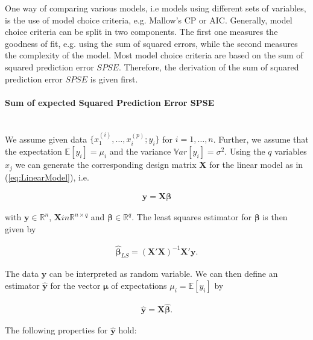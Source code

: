\documentclass[10pt,a4paper]{article}
\newcommand{\subsubsubsection}[1]{\paragraph{#1}\mbox{}\\}
\begin{document}
One way of comparing various models, i.e models using different sets of variables, is the use of model choice criteria, e.g. Mallow's CP or AIC. Generally, model choice criteria can be split in two components. The first one measures the goodness of fit, e.g. using the sum of squared errors, while the second measures the complexity of the model. Most model choice criteria are based on the sum of squared prediction error $SPSE$. Therefore, the derivation of the sum of squared prediction error $SPSE$ is given first. 

\subsubsubsection{Sum of expected Squared Prediction Error SPSE}

We assume given data $\{ x^{(i)}_{1}, \dots, x^{(p)}_{i}; y_i\}$ for $i =1, \dots, n$. Further, we assume that the expectation $\mathbb{E}[y_i] = \mu_i$ and the variance $\mathbb{V}ar[y_i] = \sigma^2$. Using the $q$ variables $x_j$ we can generate the corresponding design matrix $\boldsymbol{X}$ for the linear model as in (\ref{eq:LinearModel}), i.e.

\begin{align}
	\boldsymbol{y} = \boldsymbol{X} \boldsymbol{\beta}
\end{align}

with $\boldsymbol{y} \in \mathbb{R}^n$, $\boldsymbol{X} in \mathbb{R}^{n \times q}$ and $\boldsymbol{\beta} \in \mathbb{R}^q$. The least squares estimator for $\boldsymbol{\beta}$ is then given by

\begin{align}
	\boldsymbol{\hat{\beta}}_{LS} = (\boldsymbol{X}'\boldsymbol{X})^{-1}\boldsymbol{X}'\boldsymbol{y}.
\end{align}

The data $\boldsymbol{y}$ can be interpreted as random variable. We can then define an estimator $\boldsymbol{\hat{y}}$ for the vector $\boldsymbol{\mu}$ of expectations $\mu_i = \mathbb{E}[y_i]$ by

\begin{align} 
	\boldsymbol{\hat{y}} = \boldsymbol{X}  \boldsymbol{\hat{\beta}}.
\end{align}

The following properties for $\boldsymbol{\hat{y}}$ hold:
\end{document}
